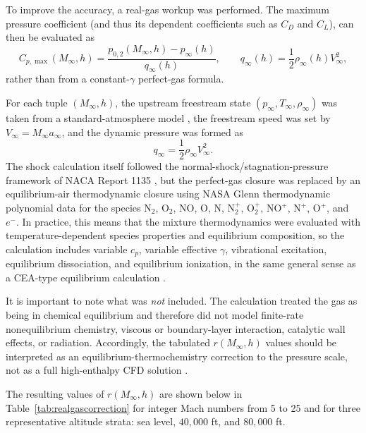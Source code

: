 To improve the accuracy, a real-gas workup was performed. The maximum pressure coefficient (and thus its dependent coefficients such as \(C_D\) and \(C_L\)), can then be evaluated as
\begin{equation}
C_{p,\max}(M_\infty,h)=\frac{p_{0,2}(M_\infty,h)-p_\infty(h)}{q_\infty(h)},
\qquad
q_\infty(h)=\frac{1}{2}\rho_\infty(h)V_\infty^2, \label{eq:rg_cp_max}
\end{equation}
rather than from a constant-\(\gamma\) perfect-gas formula.

For each tuple \((M_\infty,h)\), the upstream freestream state \((p_\infty,T_\infty,\rho_\infty)\) was taken from a standard-atmosphere model \cite{nasa_atmosphere}, the freestream speed was set by \(V_\infty=M_\infty a_\infty\), and the dynamic pressure was formed as
\begin{equation}
q_\infty=\frac{1}{2}\rho_\infty V_\infty^2.
\end{equation} 
The shock calculation itself followed the normal-shock/stagnation-pressure framework of NACA Report 1135 \cite{naca1135}, but the perfect-gas closure was replaced by an equilibrium-air thermodynamic closure using NASA Glenn thermodynamic polynomial data \cite{mcbride2002} for the species $\textrm{N}_2$, $\textrm{O}_2$, $\textrm{NO}$, O, N, $\textrm{N}_2^+$, $\textrm{O}_2^+$, $\textrm{NO}^+$, $\textrm{N}^+$, $\textrm{O}^+$, and $e^-$. In practice, this means that the mixture thermodynamics were evaluated with temperature-dependent species properties and equilibrium composition, so the calculation includes variable \(c_p\), variable effective \(\gamma\), vibrational excitation, equilibrium dissociation, and equilibrium ionization, in the same general sense as a CEA-type equilibrium calculation \cite{gordon1994cea,leader2024cea}. 

It is important to note what was \emph{not} included. The calculation treated the gas as being in chemical equilibrium and therefore did not model finite-rate nonequilibrium chemistry, viscous or boundary-layer interaction, catalytic wall effects, or radiation. Accordingly, the tabulated \(r(M_\infty,h)\) values should be interpreted as an equilibrium-thermochemistry correction to the pressure scale, not as a full high-enthalpy CFD solution \cite{gordon1994cea,leader2024cea}. 

The resulting values of \(r(M_\infty,h)\) are shown below in Table~\ref{tab:realgascorrection} for integer Mach numbers from 5 to 25 and for three representative altitude strata: sea level, \(40{,}000\) ft, and \(80{,}000\) ft.

